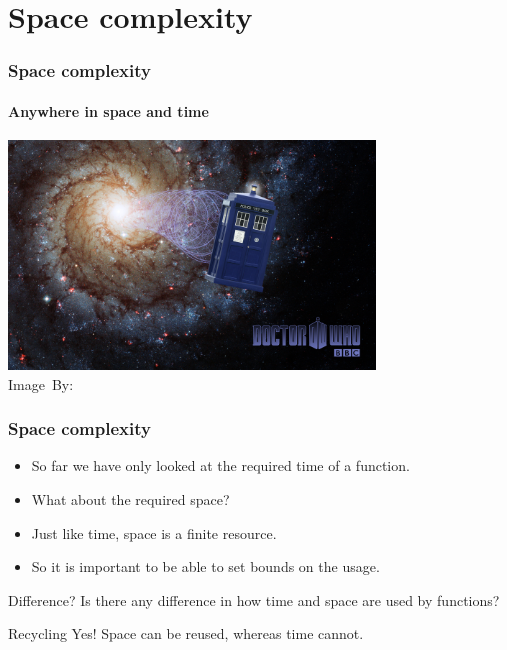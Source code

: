 \section{Space complexity}
\label{sec:space_complexity}

\begin{frame}
	\frametitle{Space complexity}
	\framesubtitle{Anywhere in space and time}
	\begin{center}
		\includegraphics[width=0.73\textwidth]{figures/tardis.jpg}\\
		\hspace*{15pt}\hbox{\scriptsize Image By:}
	\end{center}
\end{frame}

\begin{frame}
	\frametitle{Space complexity}
	\begin{itemize}
		\item So far we have only looked at the required \alert{time} of a function.
		\item What about the required \alert{space}?
			\pause
		\item Just like time, space is a \alert{finite} resource.	
		\item So it is important to be able to set bounds on the usage.
	\end{itemize}
	\pause
	\begin{questionblock}{Difference?}
		Is there any difference in how time and space are used by functions?
	\end{questionblock}
	\pause
	\begin{answerblock}{Recycling}
		Yes! Space can be reused, whereas time cannot.
	\end{answerblock}
\end{frame}

